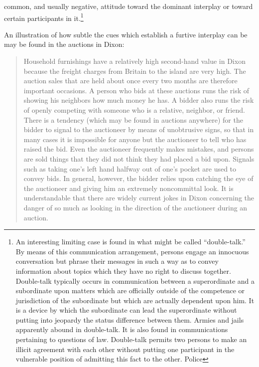 \documentclass[openany,nobib]{tufte-book}
\begin{document}
common, and usually negative, attitude toward the dominant interplay or
toward certain participants in it.\footnote{An interesting limiting case
  is found in what might be called ``double-talk.'' By means of this
  communication arrangement, persons engage an innocuous conversation
  but phrase their messages in such a way as to convey information about
  topics which they have no right to discuss together. Double-talk
  typically occurs in communication between a superordinate and a
  subordinate upon matters which are officially outside of the
  competence or jurisdiction of the subordinate but which are actually
  dependent upon him. It is a device by which the subordinate can lead
  the superordinate without putting into jeopardy the status difference
  between them. Armies and jails apparently abound in double-talk. It is
  also found in communications pertaining to questions of law.
  Double-talk permits two persons to make an illicit agreement with each
  other without putting one participant in the vulnerable position of
  admitting this fact to the other. Police}

An illustration of how subtle the cues which establish a furtive
interplay can be may be found in the auctions in Dixon:

\begin{quote}
Household furnishings have a relatively high second-hand value in Dixon
because the freight charges from Britain to the island are very high.
The auction sales that are held about once every two months are
therefore important occasions. A person who bids at these auctions runs
the risk of showing his neighbors how much money he has. A bidder also
runs the risk of openly competing with someone who is a relative,
neighbor, or friend. There is a tendency (which may be found in auctions
anywhere) for the bidder to signal to the auctioneer by means of
unobtrusive signs, so that in many cases it is impossible for anyone but
the auctioneer to tell who has raised the bid. Even the auctioneer
frequently makes mistakes, and persons are sold things that they did not
think they had placed a bid upon. Signals such as taking one's left hand
halfway out of one's pocket are used to convey bids. In general,
however, the bidder relies upon catching the eye of the auctioneer and
giving him an extremely noncommittal look. It is understandable that
there are widely current jokes in Dixon concerning the danger of so much
as looking in the direction of the auctioneer during an auction.
\end{quote}
\end{document}
